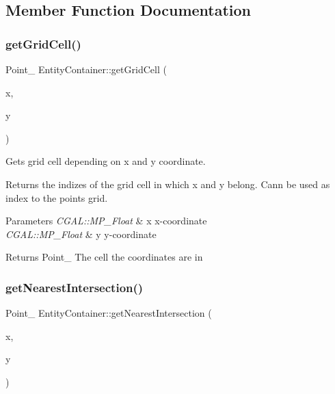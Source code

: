 \subsection{Member Function Documentation}
\hypertarget{class_entity_container_a9a7c554edd1f83a1be2616c0136e42c5}{}\label{class_entity_container_a9a7c554edd1f83a1be2616c0136e42c5} 
\subsubsection{\texorpdfstring{get\+Grid\+Cell()}{getGridCell()}}
{\footnotesize\ttfamily Point\+\_ Entity\+Container\+::get\+Grid\+Cell (\begin{DoxyParamCaption}\item[{C\+G\+A\+L\+::\+M\+P\+\_\+\+Float}]{x,  }\item[{C\+G\+A\+L\+::\+M\+P\+\_\+\+Float}]{y }\end{DoxyParamCaption})}



Gets grid cell depending on x and y coordinate. 

Returns the indizes of the grid cell in which x and y belong. Cann be used as index to the points grid.


\begin{DoxyParams}{Parameters}
{\em C\+G\+A\+L\+::\+M\+P\+\_\+\+Float} & x x-\/coordinate \\
\hline
{\em C\+G\+A\+L\+::\+M\+P\+\_\+\+Float} & y y-\/coordinate\\
\hline
\end{DoxyParams}
\begin{DoxyReturn}{Returns}
Point\+\_ The cell the coordinates are in 
\end{DoxyReturn}
\hypertarget{class_entity_container_a784de18b1f33fa8badc79fc369d29935}{}\label{class_entity_container_a784de18b1f33fa8badc79fc369d29935} 
\subsubsection{\texorpdfstring{get\+Nearest\+Intersection()}{getNearestIntersection()}}
{\footnotesize\ttfamily Point\+\_ Entity\+Container\+::get\+Nearest\+Intersection (\begin{DoxyParamCaption}\item[{C\+G\+A\+L\+::\+M\+P\+\_\+\+Float}]{x,  }\item[{C\+G\+A\+L\+::\+M\+P\+\_\+\+Float}]{y }\end{DoxyParamCaption})}




